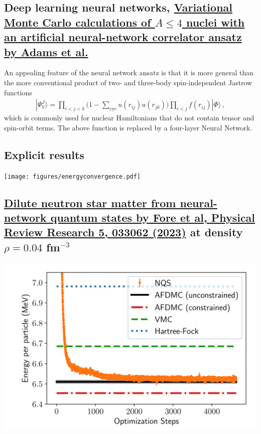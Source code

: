 \documentclass[%
oneside,                 %
final,                   %
10pt]{article}
\begin{document}
\subsection{Deep learning neural networks, \href{{https://journals.aps.org/prl/abstract/10.1103/PhysRevLett.127.022502}}{Variational Monte Carlo calculations of $A\le 4$ nuclei with an artificial neural-network correlator ansatz by Adams et al.}}

An appealing feature of the neural network ansatz is that it is more general than the more conventional product of two-
and three-body spin-independent Jastrow functions
\begin{align}
|\Psi_V^J \rangle = \prod_{i<j<k} \Big( 1-\sum_{\text{cyc}} u(r_{ij}) u(r_{jk})\Big) \prod_{i<j} f(r_{ij}) | \Phi\rangle\,,
\end{align}
which is commonly used for nuclear Hamiltonians that do not contain tensor and spin-orbit terms.
The above function is replaced by a four-layer Neural Network. 

\subsection{Explicit results}

\vspace{6mm}

\centerline{\texttt{[image: figures/energyconvergence.pdf]}}

\vspace{6mm}

\subsection{\href{{https://journals.aps.org/prresearch/pdf/10.1103/PhysRevResearch.5.033062}}{Dilute neutron star matter from neural-network quantum states by Fore et al, Physical Review Research 5, 033062 (2023)} at density $\rho=0.04$ fm$^{-3}$}

\begin{block}{}

\vspace{6mm}

\centerline{\includegraphics[width=0.9\linewidth]{figures/nmatter.png}}

\vspace{6mm}

\end{block}
\end{document}
